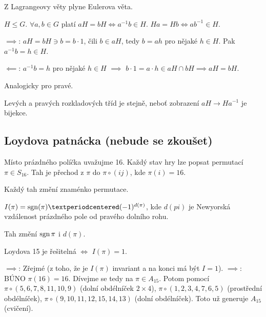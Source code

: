 \documentclass[12pt]{article}                   %
\begin{document}
        \begin{poznamka}
            Z Lagrangeovy věty plyne Eulerova věta.
        \end{poznamka}

        \begin{tvrzeni}
            $H ≤ G$. $\forall a, b \in G$ platí $aH = bH \Leftrightarrow a^{-1}b \in H$. $Ha = Hb \Leftrightarrow ab^{-1} \in H$.

            \begin{dukazin}
                $\implies$: $aH = bH \ni b = b·1$, čili $b \in aH$, tedy $b = ah$ pro nějaké $h \in H$. Pak $a^{-1}b = h \in H$.

                $\impliedby$: $a^{-1}b = h$ pro nějaké $h \in H$ $\implies$ $b·1 = a·h \in aH \cap bH \implies aH = bH$.

                Analogicky pro pravé.
            \end{dukazin}
        \end{tvrzeni}

        \begin{dusledek}
            Levých a pravých rozkladových tříd je stejně, neboť zobrazení $aH \rightarrow Ha^{-1}$ je bijekce.
        \end{dusledek}

    \subsection{Loydova patnácka (nebude se zkoušet)}
        Místo prázdného políčka uvažujme 16. Každý stav hry lze popsat permutací $\pi \in S_{16}$. Tah je přechod z $\pi$ do $\pi\circ(ij)$, kde $\pi(i) = 16$.

        \begin{pozorovani}
            Každý tah změní znaménko permutace.
        \end{pozorovani}

        \begin{definice}
            $I(\pi) = \sgn(\pi)·(-1)^{d(\pi)}$, kde $d(pi)$ je Newyorská vzdálenost prázdného pole od pravého dolního rohu.

            \begin{dukazin}[Invariant]
                Tah změní $\operatorname{sgn} \pi$ i $d(\pi)$.
            \end{dukazin}
        \end{definice}

        \begin{veta}
            Loydova 15 je řešitelná $\Leftrightarrow$ $I(\pi) = 1$.

            \begin{dukazin}
                $\implies$: Zřejmé (z toho, že je $I(\pi)$ invariant a na konci má být $I = 1$). $\implies$: BÚNO $\pi(16) = 16$. Dívejme se tedy na $\pi \in A_{15}$. Potom pomocí $\pi \circ (5, 6, 7, 8, 11, 10, 9)$ (dolní obdélníček $2 \times 4$), $\pi \circ (1, 2, 3, 4, 7, 6, 5)$ (prostřední obdélníček), $\pi \circ (9, 10, 11, 12, 15, 14, 13)$ (dolní obdélníček). Toto už generuje $A_{15}$ (cvičení).
            \end{dukazin}
        \end{veta}
\end{document}

